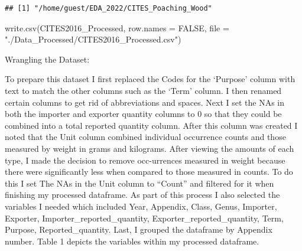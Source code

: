 \documentclass[
  12pt,
]{article}
\newenvironment{Shaded}{\begin{snugshade}}{\end{snugshade}}
\newcommand{\AttributeTok}[1]{\textcolor[rgb]{0.77,0.63,0.00}{#1}}
\newcommand{\ConstantTok}[1]{\textcolor[rgb]{0.00,0.00,0.00}{#1}}
\newcommand{\FunctionTok}[1]{\textcolor[rgb]{0.00,0.00,0.00}{#1}}
\newcommand{\NormalTok}[1]{#1}
\newcommand{\StringTok}[1]{\textcolor[rgb]{0.31,0.60,0.02}{#1}}
\begin{document}
\begin{verbatim}
## [1] "/home/guest/EDA_2022/CITES_Poaching_Wood"
\end{verbatim}

\begin{Shaded}
\begin{Highlighting}[]
\FunctionTok{write.csv}\NormalTok{(CITES2016\_Processed, }\AttributeTok{row.names =} \ConstantTok{FALSE}\NormalTok{, }\AttributeTok{file =} \StringTok{"./Data\_Processed/CITES2016\_Processed.csv"}\NormalTok{)}
\end{Highlighting}
\end{Shaded}

Wrangling the Dataset:

To prepare this dataset I first replaced the Codes for the `Purpose'
column with text to match the other columns such as the `Term' column. I
then renamed certain columns to get rid of abbreviations and spaces.
Next I set the NAs in both the importer and exporter quantity columns to
0 so that they could be combined into a total reported quantity column.
After this column was created I noted that the Unit column combined
individual occurrence counts and those measured by weight in grams and
kilograms. After viewing the amounts of each type, I made the decision
to remove occ-urrences measured in weight because there were
significantly less when compared to those measured in counts. To do this
I set The NAs in the Unit column to ``Count'' and filtered for it when
finishing my processed dataframe. As part of this process I also
selected the variables I needed which included Year, Appendix, Class,
Genus, Importer, Exporter, Importer\_reported\_quantity,
Exporter\_reported\_quantity, Term, Purpose, Reported\_quantity. Last, I
grouped the dataframe by Appendix number. Table 1 depicts the variables
within my processed dataframe.
\end{document}
